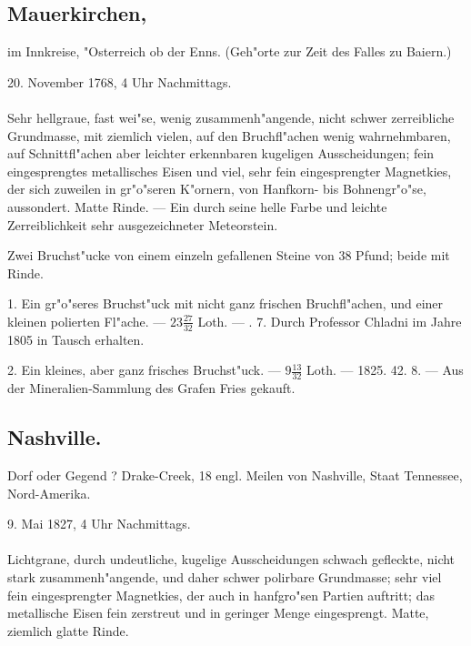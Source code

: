 \documentclass[a4paper, 11pt, oneside, polutonikogreek, german]{article}
\begin{document}
\subsection[Mauerkirchen.]{Mauerkirchen,}
\begin{center}
\small
im Innkreise, "Osterreich ob der Enns. (Geh"orte zur Zeit des Falles zu Baiern.)

20. November 1768, 4 Uhr Nachmittags.
\end{center}
\paragraph{}
Sehr hellgraue, fast wei"se, wenig zusammenh"angende, nicht schwer zerreibliche Grundmasse, mit ziemlich vielen, auf den Bruchfl"achen wenig wahrnehmbaren, auf Schnittfl"achen aber leichter erkennbaren kugeligen Ausscheidungen; fein eingesprengtes metallisches Eisen und viel, sehr fein eingesprengter Magnetkies, der sich zuweilen in gr"o"seren K"ornern, von Hanfkorn- bis Bohnengr"o"se, aussondert. Matte Rinde. --- Ein durch seine helle Farbe und leichte Zerreiblichkeit sehr ausgezeichneter Meteorstein.

Zwei Bruchst"ucke von einem einzeln gefallenen Steine von 38 Pfund; beide mit Rinde.

1. Ein gr"o"seres Bruchst"uck mit nicht ganz frischen Bruchfl"achen, und einer kleinen polierten Fl"ache. --- $23\frac{27}{32}$ Loth. --- . 7. Durch Professor Chladni im Jahre 1805 in Tausch erhalten.

2. Ein kleines, aber ganz frisches Bruchst"uck. --- $9\frac{13}{32}$ Loth. --- 1825. 42. 8. --- Aus der Mineralien-Sammlung des Grafen Fries gekauft.
\subsection{Nashville.}
\begin{center}
\small
Dorf oder Gegend ? Drake-Creek, 18 engl. Meilen von Nashville, Staat Tennessee, Nord-Amerika.

9. Mai 1827, 4 Uhr Nachmittags.
\end{center}
\paragraph{}
Lichtgrane, durch undeutliche, kugelige Ausscheidungen schwach gefleckte, nicht stark zusammenh"angende, und daher schwer polirbare Grundmasse; sehr viel fein eingesprengter Magnetkies, der auch in hanfgro"sen Partien auftritt; das metallische Eisen fein zerstreut und in geringer Menge eingesprengt. Matte, ziemlich glatte Rinde.
\end{document}
